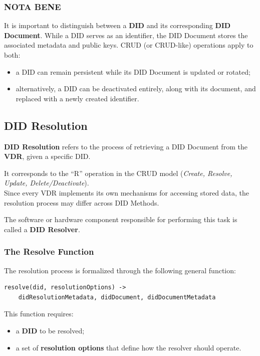 \subsubsection *{NOTA BENE}
It is important to distinguish between a \textbf{DID} and its corresponding \textbf{DID Document}.  
While a DID serves as an identifier, the DID Document stores the associated metadata and public keys.  
CRUD (or CRUD-like) operations apply to both:
\begin{itemize}
    \item a DID can remain persistent while its DID Document is updated or rotated;  
    \item alternatively, a DID can be deactivated entirely, along with its document, and replaced with a newly created identifier.
\end{itemize}

\subsection{DID Resolution}

\textbf{DID Resolution} refers to the process of retrieving a DID Document from the \textbf{VDR}, given a specific DID.
\smallskip

\noindent
It corresponds to the ``R'' operation in the CRUD model (\textit{Create, Resolve, Update, Delete/Deactivate}).\\ 
Since every VDR implements its own mechanisms for accessing stored data, the resolution process may differ across DID Methods.

\medskip

\noindent
The software or hardware component responsible for performing this task is called a \textbf{DID Resolver}.

\subsubsection *{The Resolve Function}
The resolution process is formalized through the following general function:

\begin{verbatim}
resolve(did, resolutionOptions) -> 
    didResolutionMetadata, didDocument, didDocumentMetadata
\end{verbatim}

\noindent
This function requires:
\begin{itemize}
    \item a \textbf{DID} to be resolved;
    \item a set of \textbf{resolution options} that define how the resolver should operate.
\end{itemize}

